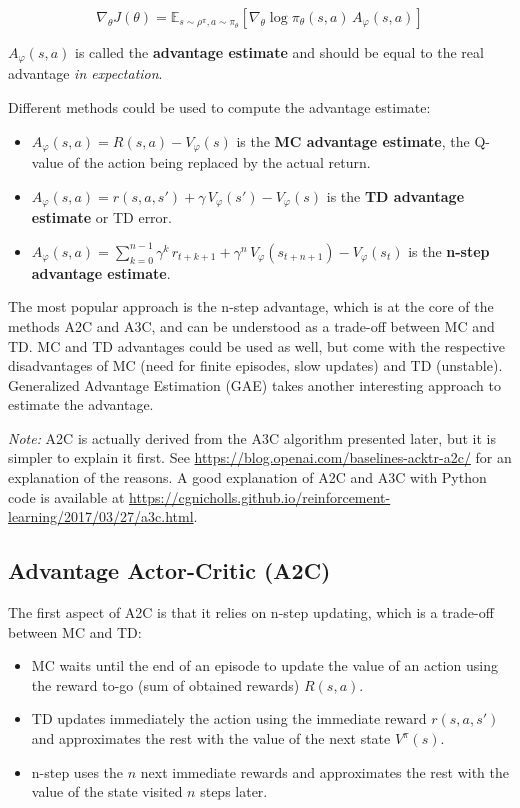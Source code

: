 \documentclass[
  letterpaper,
  DIV=11,
  numbers=noendperiod]{scrreprt}
\providecommand{\tightlist}{%
  \setlength{\itemsep}{0pt}\setlength{\parskip}{0pt}}\usepackage{longtable,booktabs,array}
\begin{document}
\[
    \nabla_\theta J(\theta) =  \mathbb{E}_{s \sim \rho^\pi, a \sim \pi_\theta}[\nabla_\theta \log \pi_\theta(s, a) \, A_\varphi(s, a)]
\]

\(A_\varphi(s, a)\) is called the \textbf{advantage estimate} and should
be equal to the real advantage \emph{in expectation}.

Different methods could be used to compute the advantage estimate:

\begin{itemize}
\item
  \(A_\varphi(s, a) = R(s, a) - V_\varphi(s)\) is the \textbf{MC
  advantage estimate}, the Q-value of the action being replaced by the
  actual return.
\item
  \(A_\varphi(s, a) = r(s, a, s') + \gamma \, V_\varphi(s') - V_\varphi(s)\)
  is the \textbf{TD advantage estimate} or TD error.
\item
  \(A_\varphi(s, a) = \sum_{k=0}^{n-1} \gamma^{k} \, r_{t+k+1} + \gamma^n \, V_\varphi(s_{t+n+1}) - V_\varphi(s_t)\)
  is the \textbf{n-step advantage estimate}.
\end{itemize}

The most popular approach is the n-step advantage, which is at the core
of the methods A2C and A3C, and can be understood as a trade-off between
MC and TD. MC and TD advantages could be used as well, but come with the
respective disadvantages of MC (need for finite episodes, slow updates)
and TD (unstable). Generalized Advantage Estimation (GAE) takes another
interesting approach to estimate the advantage.

\emph{Note:} A2C is actually derived from the A3C algorithm presented
later, but it is simpler to explain it first. See
\url{https://blog.openai.com/baselines-acktr-a2c/} for an explanation of
the reasons. A good explanation of A2C and A3C with Python code is
available at
\url{https://cgnicholls.github.io/reinforcement-learning/2017/03/27/a3c.html}.

\hypertarget{advantage-actor-critic-a2c}{%
\subsection{Advantage Actor-Critic
(A2C)}\label{advantage-actor-critic-a2c}}

The first aspect of A2C is that it relies on n-step updating, which is a
trade-off between MC and TD:

\begin{itemize}
\tightlist
\item
  MC waits until the end of an episode to update the value of an action
  using the reward to-go (sum of obtained rewards) \(R(s, a)\).
\item
  TD updates immediately the action using the immediate reward
  \(r(s, a, s')\) and approximates the rest with the value of the next
  state \(V^\pi(s)\).
\item
  n-step uses the \(n\) next immediate rewards and approximates the rest
  with the value of the state visited \(n\) steps later.
\end{itemize}
\end{document}
